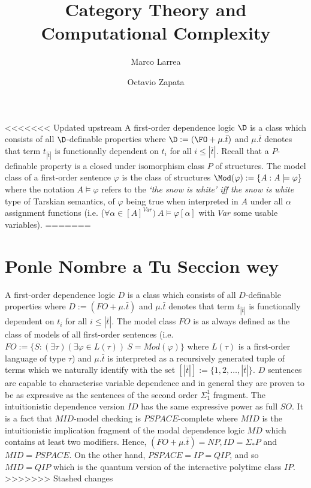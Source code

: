 \documentclass[10.5pt]{article}
\title{Category Theory and \\ Computational Complexity}
\author{Marco Larrea \and Octavio Zapata}
\begin{document}
\maketitle
<<<<<<< Updated upstream
A first-order dependence logic $\D$ is a class which consists of all $\D$-definable properties where $\D := (\FO + \mu.\bar{t})$ and $\mu.\bar{t}$ denotes that term $t_{|\bar{t}|}$ is functionally dependent on $t_{i}$ for all $i\leq |\bar{t}|$. Recall that a $P$-definable property is a closed under isomorphism class $P$ of structures. The model class of a first-order sentence $\varphi$ is the class of structures $\Mod(\varphi):=\{A:A\models\varphi\}$ where the notation $A\models\varphi$ refers to the \emph{`the snow is white' iff the snow is white} type of Tarskian semantics, of $\varphi$ being true when interpreted in $A$ under all $\alpha$ assignment functions (i.e. ($\forall\alpha\in [A]^{Var})\ A\models\varphi[\alpha]$ with $Var$ some usable variables). 
=======
\section{Ponle Nombre a Tu Seccion wey}
A first-order dependence logic $D$ is a class which consists of all $D$-definable properties where $D := (FO + \mu.\bar{t})$ and $\mu.\bar{t}$ denotes that term $t_{|\bar{t}|}$ is functionally dependent on $t_{i}$ for all $i\leq |\bar{t}|$. The model class $FO$ is as always defined as the class of models of all first-order sentences (i.e. $FO:= \{S:(\exists\tau)(\exists\varphi\in L(\tau))\ S=Mod(\varphi)\}$ where $L(\tau)$ is a first-order language of type $\tau$) and $\mu.\bar{t}$ is interpreted as a recursively generated tuple of terms which we naturally identify with the set $[|\bar{t}|] := \{1,2,\dots,|\bar{t}|\}$. $D$ sentences are capable to characterise variable dependence and in general they are proven to be as expressive as the sentences of the second order $\Sigma_1^1$ fragment. The intuitionistic dependence version $ID$ has the same expressive power as full $SO$. It is a fact that $MID$-model checking is $PSPACE$-complete where $MID$ is the intuitionistic implication fragment of the modal dependence logic $MD$ which contains at least two modifiers. Hence, $(FO + \mu.\bar{t}) = NP, ID = \Sigma_{\ast}P$ and $MID = PSPACE$.  On the other hand, $PSPACE = IP = QIP$, and so $MID = QIP$ which is the quantum version of the interactive polytime class $IP$.
>>>>>>> Stashed changes
\end{document}
